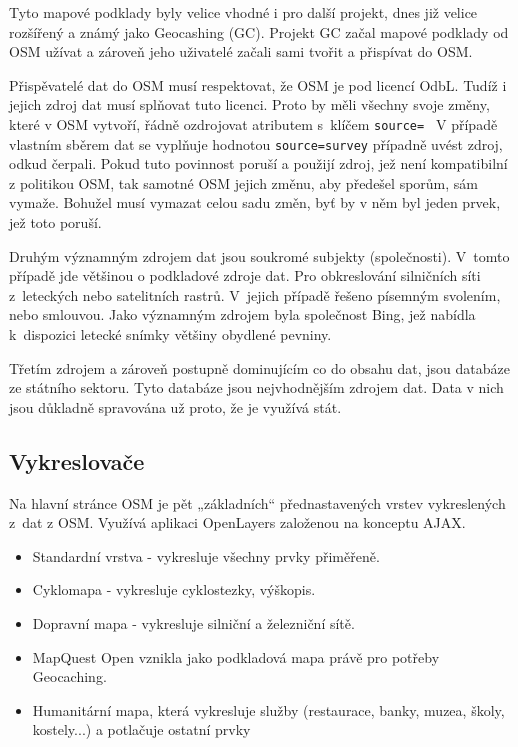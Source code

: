 Tyto mapové podklady byly velice vhodné i pro další projekt, dnes již 
velice rozšířený a známý jako Geocashing (GC). Projekt GC začal mapové 
podklady od OSM užívat a zároveň jeho uživatelé začali sami tvořit a 
přispívat do OSM. 

Přispěvatelé dat do OSM musí respektovat, že OSM je pod licencí OdbL. 
Tudíž i jejich zdroj dat musí splňovat tuto licenci. Proto by měli 
všechny svoje změny, které v OSM vytvoří, řádně ozdrojovat atributem 
s~klíčem 
{\tt source= }
V případě vlastním sběrem dat se vyplňuje hodnotou 
{\tt source=survey}
případně uvést zdroj, odkud čerpali. Pokud tuto povinnost poruší a 
použijí zdroj, jež není kompatibilní z politikou OSM, tak samotné OSM 
jejich změnu, aby předešel sporům, sám vymaže. Bohužel musí vymazat 
celou sadu změn, byť by v něm byl jeden prvek, jež toto poruší. 

Druhým významným zdrojem dat jsou soukromé subjekty (společnosti). 
V~tomto případě jde většinou o podkladové zdroje dat. Pro obkreslování 
silničních síti z~leteckých nebo satelitních rastrů. V~jejich případě 
řešeno písemným svolením, nebo smlouvou. Jako významným zdrojem byla 
společnost Bing, jež nabídla k~dispozici letecké snímky většiny 
obydlené pevniny. 

Třetím zdrojem a zároveň postupně dominujícím co do obsahu dat, jsou 
databáze ze státního sektoru. Tyto databáze jsou nejvhodnějším zdrojem 
dat. Data v nich jsou důkladně spravována už proto, že je využívá stát. 

\subsection{Vykreslovače}
\label{vykreslovače}
Na hlavní stránce OSM je pět „základních“ přednastavených vrstev vykreslených 
z~dat z OSM. Využívá aplikaci OpenLayers založenou na konceptu AJAX.

\begin{itemize}

  \item Standardní vrstva - vykresluje všechny prvky přiměřeně.
  \item Cyklomapa - vykresluje cyklostezky, výškopis. 
  \item Dopravní mapa - vykresluje silniční a železniční sítě.
  \item MapQuest Open vznikla jako podkladová mapa právě pro potřeby 
Geocaching.
  \item Humanitární mapa, která vykresluje služby (restaurace, banky, muzea, 
  školy, kostely...)  a potlačuje ostatní prvky 

\end{itemize}

